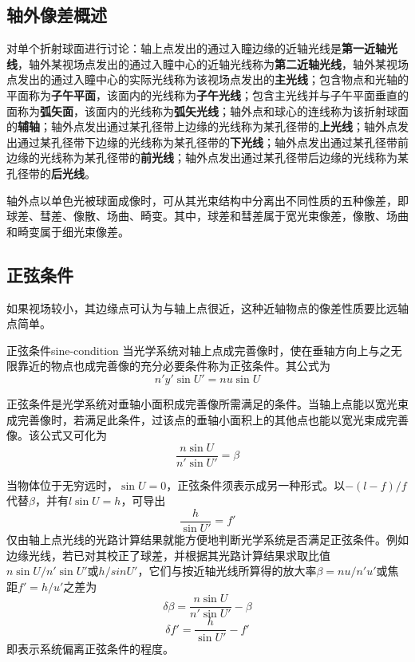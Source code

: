 \documentclass[cn,10pt,chinesefont=founder,math=mtpro2,cite=super,toc=onecol,twoside,openany]{elegantbook}
\begin{document}
\subsection{轴外像差概述}
对单个折射球面进行讨论：轴上点发出的通过入瞳边缘的近轴光线是\textbf{第一近轴光线}，轴外某视场点发出的通过入瞳中心的近轴光线称为\textbf{第二近轴光线}，轴外某视场点发出的通过入瞳中心的实际光线称为该视场点发出的\textbf{主光线}；包含物点和光轴的平面称为\textbf{子午平面}，该面内的光线称为\textbf{子午光线}；包含主光线并与子午平面垂直的面称为\textbf{弧矢面}，该面内的光线称为\textbf{弧矢光线}；轴外点和球心的连线称为该折射球面的\textbf{辅轴}；轴外点发出通过某孔径带上边缘的光线称为某孔径带的\textbf{上光线}；轴外点发出通过某孔径带下边缘的光线称为某孔径带的\textbf{下光线}；轴外点发出通过某孔径带前边缘的光线称为某孔径带的\textbf{前光线}；轴外点发出通过某孔径带后边缘的光线称为某孔径带的\textbf{后光线}。
\begin{conclusion}
	轴外点以单色光被球面成像时，可从其光束结构中分离出不同性质的五种像差，即球差、彗差、像散、场曲、畸变。其中，球差和彗差属于宽光束像差，像散、场曲和畸变属于细光束像差。
\end{conclusion}
\subsection{正弦条件}
如果视场较小，其边缘点可认为与轴上点很近，这种近轴物点的像差性质要比远轴点简单。

\begin{definition}{正弦条件}{sine-condition}
	当光学系统对轴上点成完善像时，使在垂轴方向上与之无限靠近的物点也成完善像的充分必要条件称为正弦条件。其公式为
	\begin{equation}
	n'y'\sin U'=nu\sin U
	\end{equation}
\end{definition}

正弦条件是光学系统对垂轴小面积成完善像所需满足的条件。当轴上点能以宽光束成完善像时，若满足此条件，过该点的垂轴小面积上的其他点也能以宽光束成完善像。该公式又可化为
\begin{equation}
\frac{n\sin U}{n'\sin U'}=\beta
\end{equation}

当物体位于无穷远时，$\sin U=0$，正弦条件须表示成另一种形式。以$-(l-f)/f$代替$\beta$，并有$l\sin U=h$，可导出
\begin{equation}
\frac{h}{\sin U'}=f'
\end{equation}
仅由轴上点光线的光路计算结果就能方便地判断光学系统是否满足正弦条件。例如边缘光线，若已对其校正了球差，并根据其光路计算结果求取比值$n\sin U/n'\sin U'$或$h/sin U'$，它们与按近轴光线所算得的放大率$\beta=nu/n'u'$或焦距$f'=h/u'$之差为
\begin{equation}
\delta\beta=\frac{n\sin U}{n'\sin U'}-\beta
\label{eq:delta-beta}
\end{equation}
\begin{equation}
\delta f'=\frac{h}{\sin U'}-f'
\label{eq:delta-f}
\end{equation}
即表示系统偏离正弦条件的程度。
\end{document}
